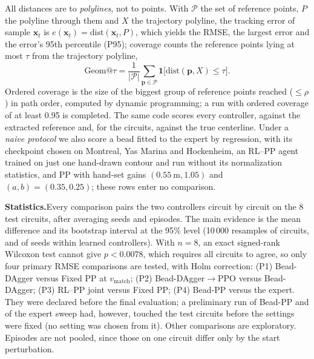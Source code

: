 \documentclass[10pt,twocolumn,twoside]{article}
\makeatletter
\newcommand{\parhead}[1]{\textbf{#1}\hspace{0.4em}}
\newcommand{\vmatch}{v_{\mathrm{match}}}
\newcommand{\geom}[1]{\mathrm{Geom}@#1}
\newcommand{\dpo}{DAgger$\to$PPO}
\newcommand{\one}{\mathbf{1}}
\makeatother
\begin{document}
All distances are to \emph{polylines}, not to points. With $\mathcal{P}$ the set
of reference points, $P$ the polyline through them and $X$ the trajectory
polyline, the tracking error of sample $\mathbf{x}_t$ is
$e(\mathbf{x}_t)=\mathrm{dist}(\mathbf{x}_t,P)$, which yields the RMSE, the
largest error and the error's 95th percentile (P95); coverage counts the
reference points lying at most $\tau$ from the trajectory polyline,
\begin{equation}
\geom{\tau}=\frac{1}{|\mathcal{P}|}\sum_{\mathbf{p}\in\mathcal{P}}\one\big[\mathrm{dist}(\mathbf{p},X)\le\tau\big].
\label{eq:geom}
\end{equation}
Ordered coverage is the size of the biggest group of reference points reached
($\le\rho$) in path order, computed by dynamic programming; a run with ordered
coverage of at least 0.95 is completed. The same code scores every controller,
against the extracted reference and, for the circuits, against the true
centerline. Under a \emph{naive protocol} we also score a bead fitted to the
expert by regression, with its checkpoint chosen on Montreal, Yas Marina and
Hockenheim, an RL--PP agent trained on just one hand-drawn contour and run without
its normalization statistics, and PP with hand-set gains $(0.55~\mathrm{m},1.05)$
and $(a,b)=(0.35,0.25)$; these rows enter no comparison.

\parhead{Statistics.}Every comparison pairs the two controllers circuit by
circuit on the 8 test circuits, after averaging seeds and episodes. The main
evidence is the mean difference and its bootstrap interval at the 95\% level
(10\,000 resamples of circuits, and of seeds within learned controllers). With
$n=8$, an exact signed-rank Wilcoxon test cannot give $p<0.0078$, which requires all
circuits to agree, so only four primary RMSE comparisons are tested, with Holm
correction: (P1) Bead-DAgger versus Fixed PP at $\vmatch$; (P2) Bead-\dpo{}
versus Bead-DAgger; (P3) RL--PP joint versus Fixed PP; (P4) Bead-PP versus the
expert. They were declared before the final evaluation; a preliminary run of
Bead-PP and of the expert sweep had, however, touched the test circuits before
the settings were fixed (no setting was chosen from it). Other comparisons are
exploratory. Episodes are not pooled, since those on one circuit differ only by
the start perturbation.
\end{document}
